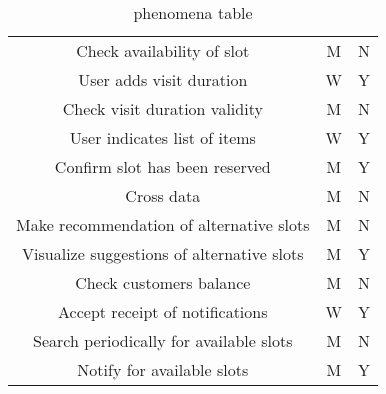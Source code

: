 \documentclass{article}
\begin{document}
\begin{center}
\begin{table}
\begin{tabularx}{\textwidth}{| c| c| c|}
            Check availability of slot                 & M                & N          \\
            User adds visit duration                   & W                & Y          \\
            Check visit duration validity              & M                & N          \\
            User indicates list of items               & W                & Y          \\
            Confirm slot has been reserved             & M                & Y          \\
            Cross data                                 & M                & N          \\
            Make recommendation of alternative slots   & M                & N          \\
            Visualize suggestions of alternative slots & M                & Y          \\
            Check customers balance                    & M                & N          \\
            Accept receipt of notifications            & W                & Y          \\
            Search periodically for available slots    & M                & N          \\
            Notify for available slots                 & M                & Y          \\

            \hline
        \end{tabularx}
        \caption{phenomena table}
    \end{table}
\end{center}
\end{document}
